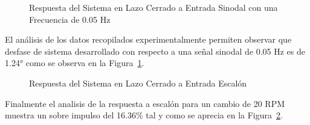 \documentclass[conference,onecolumn]{IEEEtran}
\begin{document}
\begin{figure}[H]
    \centering
    \caption{Respuesta del Sistema en Lazo Cerrado a Entrada Sinodal con una Frecuencia de 0.05 Hz}
    \label{fig:close_loop_sine_response}
\end{figure}

El análisis de los datos recopilados experimentalmente permiten observar que desfase de sistema desarrollado con respecto a una señal sinodal de 0.05 Hz es de 1.24° como se observa en la Figura~\ref{fig:close_loop_sine_response}.

\begin{figure}[H]
    \centering
    \caption{Respuesta del Sistema en Lazo Cerrado a Entrada Escalón}
    \label{fig:close_loop_step_response}
\end{figure}
Finalmente el analisis de la respuesta a escalón para un cambio de 20 RPM muestra un sobre impulso del 16.36\% tal y como se aprecia en la Figura~\ref{fig:close_loop_step_response}.
\end{document}
